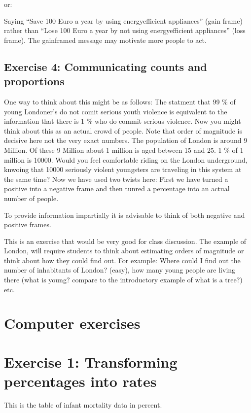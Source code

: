 \documentclass[letterpaper,10pt,english]{jupyterBook}
\begin{document}
\sphinxAtStartPar
or:

\sphinxAtStartPar
Saying “Save 100 Euro a year by using energy\sphinxhyphen{}efficient appliances” (gain frame) rather than “Lose 100 Euro a year by not using energy\sphinxhyphen{}efficient appliances” (loss frame). The gain\sphinxhyphen{}framed message may motivate more people to act.


\subsection{Exercise 4: Communicating counts and proportions}
\label{\detokenize{exercises_unit_1:exercise-4-communicating-counts-and-proportions}}
\sphinxAtStartPar
One way to think about this might be as follows: The statment that 99 \% of young Londoner’s do not comit serious youth violence is equivalent to the information that there is 1 \% who do commit serious violence. Now you might think about this as an actual crowd of people. Note that order of magnitude is decisive here not the very exact numbers. The population of London is around 9 Million. Of these 9 Million about 1 million is aged between 15 and 25. 1 \% of 1 million is 10000. Would you feel comfortable riding on the London underground, knwoing that 10000 seriously violent youngsters are traveling in this system at the same time? Now we have used two twists here: First we have turned a positive into a negative frame and then tunred a percentage into an actual number of people.

\sphinxAtStartPar
To provide information impartially it is advisable to think of both negative and positive frames.

\sphinxAtStartPar
This is an exercise that would be very good for class discussion. The example of London, will require students to think about estimating orders of magnitude or think about how they could find out. For example: Where could I find out the number of inhabitants of London? (easy), how many young people are living there (what is young? compare to the introductory example of what is a tree?) etc.


\section{Computer exercises}
\label{\detokenize{exercises_unit_1:computer-exercises}}

\section{Exercise 1: Transforming percentages into rates}
\label{\detokenize{exercises_unit_1:exercise-1-transforming-percentages-into-rates}}
\sphinxAtStartPar
This is the table of infant mortality data in percent.
\end{document}
